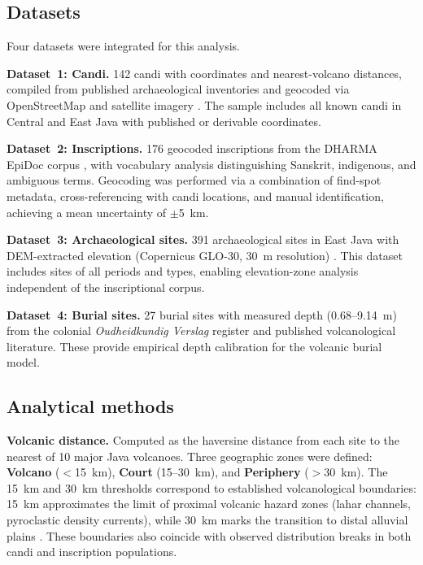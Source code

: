 \documentclass[12pt]{article}
\begin{document}
\subsection{Datasets}

Four datasets were integrated for this analysis.

\textbf{Dataset~1: Candi.} 142 candi with coordinates and nearest-volcano distances, compiled from published archaeological inventories and geocoded via OpenStreetMap and satellite imagery \citep{Degroot2009, Kinney2003}.
The sample includes all known candi in Central and East Java with published or derivable coordinates.

\textbf{Dataset~2: Inscriptions.} 176 geocoded inscriptions from the DHARMA EpiDoc corpus \citep{DHARMA2024}, with vocabulary analysis distinguishing Sanskrit, indigenous, and ambiguous terms.
Geocoding was performed via a combination of find-spot metadata, cross-referencing with candi locations, and manual identification, achieving a mean uncertainty of $\pm$5~km.

\textbf{Dataset~3: Archaeological sites.} 391 archaeological sites in East Java with DEM-extracted elevation (Copernicus GLO-30, 30~m resolution) \citep{Copernicus2019}.
This dataset includes sites of all periods and types, enabling elevation-zone analysis independent of the inscriptional corpus.

\textbf{Dataset~4: Burial sites.} 27 burial sites with measured depth (0.68--9.14~m) from the colonial \textit{Oudheidkundig Verslag} register \citep{OV1912} and published volcanological literature.
These provide empirical depth calibration for the volcanic burial model.

\subsection{Analytical methods}

\textbf{Volcanic distance.} Computed as the haversine distance from each site to the nearest of 10 major Java volcanoes.
Three geographic zones were defined: \textbf{Volcano} ($<$15~km), \textbf{Court} (15--30~km), and \textbf{Periphery} ($>$30~km).
The 15~km and 30~km thresholds correspond to established volcanological boundaries: 15~km approximates the limit of proximal volcanic hazard zones (lahar channels, pyroclastic density currents), while 30~km marks the transition to distal alluvial plains \citep{Lavigne2000}.
These boundaries also coincide with observed distribution breaks in both candi and inscription populations.
\end{document}
